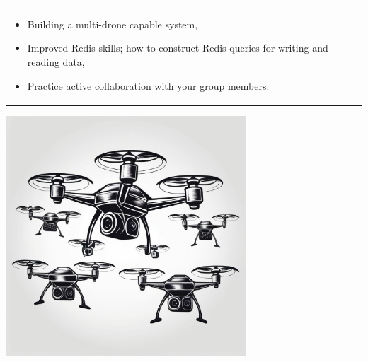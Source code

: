 \documentclass{article}
\begin{document}
\vspace{.1cm}
\begin{center}
\begin{tabular}{l}
\toprule[1.5pt]
\parbox{0.8\linewidth}{
\vspace{.2cm}{\Large Learning goals:}
\begin{itemize}
    \item Building a multi-drone capable system,
    \item Improved Redis skills; how to construct Redis queries for writing and reading data,
    \item Practice active collaboration with your group members.
\end{itemize}}\\
\bottomrule[1.5pt]
\end{tabular}
\end{center}
\vfill
\begin{center}
\includegraphics[width=90mm]{swarm.jpg}
\end{center}
\end{document}
